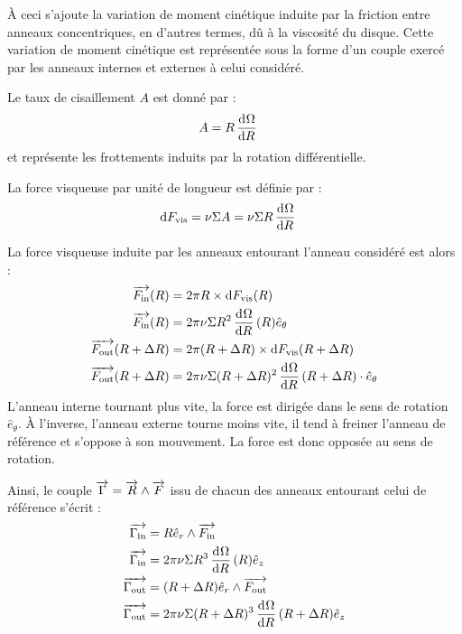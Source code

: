 \bigskip

À ceci s'ajoute la variation de moment cinétique induite par la friction entre anneaux concentriques, en d'autres termes, dû à
la viscosité du disque. Cette variation de moment cinétique est représentée sous la forme d'un couple exercé par les anneaux
internes et externes à celui considéré. 

Le taux de cisaillement $A$ est donné par : 
\begin{align}
A &= R \mathinner{ \dfrac{\operatorname{d \!}{^{}}\Omega}{\operatorname{d \!}{{R}^{}}} }
\end{align}
et représente les frottements induits par la rotation différentielle.

La force visqueuse par unité de longueur est définie par :
\begin{align}
\operatorname{d \!} F_\text{vis} &= \nu \Sigma A = \nu \Sigma R \mathinner{ \dfrac{\operatorname{d \!}{^{}}\Omega}{\operatorname{d \!}{{R}^{}}} }
\end{align}

La force visqueuse induite par les anneaux entourant l'anneau considéré est alors : 
\begin{subequations}
\begin{align}
\vect{F_\text{in}}(R) &= 2\pi R \times \dif F_\text{vis}(R) \nonumber\\
\vect{F_\text{in}}(R)&= 2\pi\nu \Sigma R^2 \dod{\Omega}{R}(R) \hat{e}_\theta\\
\vect{F_\text{out}}(R+\Delta R) &= 2\pi (R+\Delta R) \times \dif F_\text{vis}(R+\Delta R) \nonumber\\
\vect{F_\text{out}}(R+\Delta R)&= 2\pi\nu \Sigma (R+\Delta R)^2 \dod{\Omega}{R}(R+\Delta R) \cdot \hat{e}_\theta
\end{align}
\end{subequations}
L'anneau interne tournant plus vite, la force est dirigée dans le sens de rotation $\hat{e}_\theta$. À l'inverse, l'anneau externe tourne moins vite, il tend à freiner l'anneau de référence et s'oppose à son mouvement. La force est donc opposée au sens de rotation.

\bigskip

Ainsi, le couple ${\overrightarrow{\Gamma}}={\overrightarrow{R}}\wedge{\overrightarrow{F}}$ issu de chacun des anneaux entourant celui de référence s'écrit :
\begin{subequations}
\begin{align}
\vect{\Gamma_\text{in}} &= R\hat{e}_r\wedge\vect{F_\text{in}}\nonumber\\
\vect{\Gamma_\text{in}} &= 2\pi\nu \Sigma R^3 \dod{\Omega}{R}(R) \hat{e}_z\label{eq:G_in2}\\
\vect{\Gamma_\text{out}} &= (R+\Delta R)\hat{e}_r\wedge\vect{F_\text{out}}\nonumber\\
\vect{\Gamma_\text{out}} &= 2\pi\nu \Sigma (R+\Delta R)^3 \dod{\Omega}{R}(R+\Delta R) \hat{e}_z\label{eq:G_out2}
\end{align}\label{eq:J_torques2}
\end{subequations}

